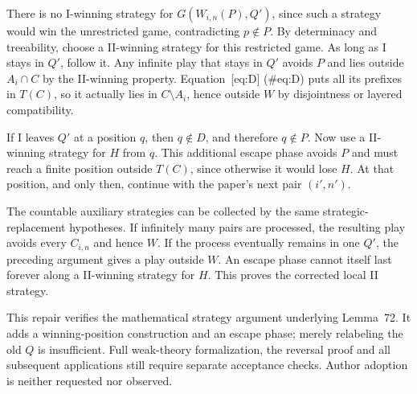 \documentclass[10pt]{article}
\begin{document}
There is no I-winning strategy for \(G(W_{i,n}(P),Q')\), since such a strategy would win the unrestricted game, contradicting \(p\notin P\). By determinacy and treeability, choose a II-winning strategy for this restricted game. As long as I stays in \(Q'\), follow it. Any infinite play that stays in \(Q'\) avoids \(P\) and lies outside \(A_i\cap C\) by the II-winning property. Equation [eq:D] (\#eq:D) puts all its prefixes in \(T(C)\), so it actually lies in \(C\setminus A_i\), hence outside \(W\) by disjointness or layered compatibility.\par
If I leaves \(Q'\) at a position \(q\), then \(q\notin D\), and therefore \(q\notin P\). Now use a II-winning strategy for \(H\) from \(q\). This additional escape phase avoids \(P\) and must reach a finite position outside \(T(C)\), since otherwise it would lose \(H\). At that position, and only then, continue with the paper’s next pair \((i',n')\).\par
The countable auxiliary strategies can be collected by the same strategic-replacement hypotheses. If infinitely many pairs are processed, the resulting play avoids every \(C_{i,n}\) and hence \(W\). If the process eventually remains in one \(Q'\), the preceding argument gives a play outside \(W\). An escape phase cannot itself last forever along a II-winning strategy for \(H\). This proves the corrected local II strategy.\par
This repair verifies the mathematical strategy argument underlying Lemma 72. It adds a winning-position construction and an escape phase; merely relabeling the old \(Q\) is insufficient. Full weak-theory formalization, the reversal proof and all subsequent applications still require separate acceptance checks. Author adoption is neither requested nor observed.\par
\end{document}
